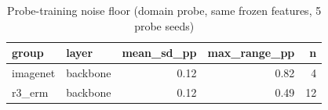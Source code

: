 \begin{table}
\caption{Probe-training noise floor (domain probe, same frozen features, 5 probe seeds)}
\label{tab:leak_noise_floor}
\begin{tabular}{llrrr}
\toprule
group & layer & mean\_sd\_pp & max\_range\_pp & n \\
\midrule
imagenet & backbone & 0.12 & 0.82 & 4 \\
r3\_erm & backbone & 0.12 & 0.49 & 12 \\
\bottomrule
\end{tabular}
\end{table}
